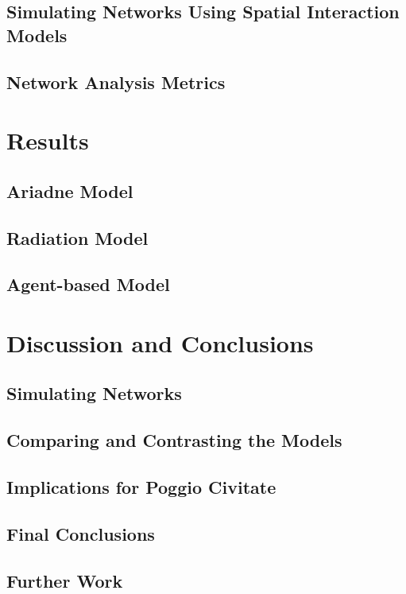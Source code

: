 \documentclass[12pt,a4paper]{thesis}
\begin{document}
\section{Simulating Networks Using Spatial Interaction Models}


\paragraph{}


\section{Network Analysis Metrics}

\chapter{Results}
\section{Ariadne Model}
\section{Radiation Model}
\section{Agent-based Model}

\chapter{Discussion and Conclusions}
\section{Simulating Networks}
\section{Comparing and Contrasting the Models}
\section{Implications for Poggio Civitate}
\section{Final Conclusions}
\section{Further Work}



\end{document}
